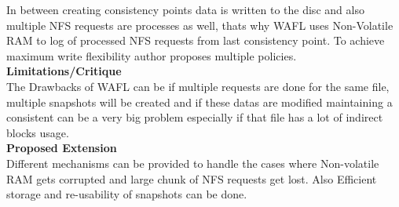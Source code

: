 \documentclass[a4paper, 10pt]{article}
\begin{document}
In between creating consistency points data is written to the disc and also multiple NFS requests are processes as well, thats why WAFL uses Non-Volatile RAM to log of processed NFS requests from last consistency point. To achieve maximum write flexibility author proposes multiple policies.\\
  
\noindent
\large\textbf{Limitations/Critique}\\
The Drawbacks of WAFL can be if multiple requests are done for the same file, multiple snapshots will be created and if these datas are modified maintaining a consistent can be a very big problem especially if that file has a lot of indirect blocks usage.\\ 

\noindent
\large\textbf{Proposed Extension}\\
Different mechanisms can be provided to handle the cases where Non-volatile RAM gets corrupted and large chunk of NFS requests get lost. Also Efficient storage and re-usability of snapshots can be done.
\end{document}
